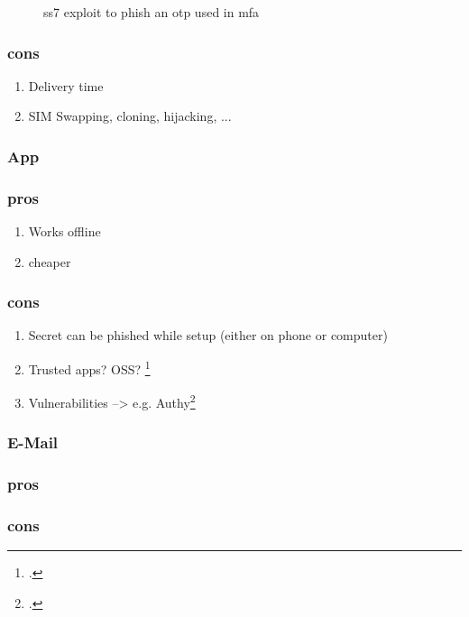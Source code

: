 \begin{figure}[hbt]
	\centering
	
	\caption[\gls{ss7} exploit to phish an \gls{otp} used in \gls{mfa}]{\gls{ss7} exploit to phish an \gls{otp} used in \gls{mfa}\footnotemark}
	\label{fig:2fa_flow_ss7}
\end{figure}

\subsubsection{cons}

\begin{enumerate}
	\item Delivery time
	\item SIM Swapping, cloning, hijacking, ...
\end{enumerate}

\subsubsection{App}

\subsubsection{pros}

\begin{enumerate}
	\item Works offline
	\item cheaper
\end{enumerate}

\subsubsection{cons}

\begin{enumerate}
	\item Secret can be phished while setup (either on phone or computer)
	\item Trusted apps? OSS? \footcite{eset-bypass2fa}
	\item Vulnerabilities --> e.g. Authy\footcite{sakurity-authy}
\end{enumerate}

\subsubsection{E-Mail}

\subsubsection{pros}

\subsubsection{cons}
